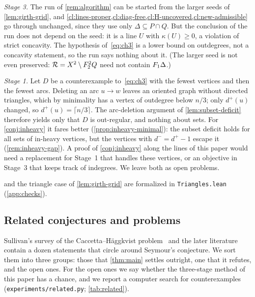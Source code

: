 \begin{remark}\label{rem:ch-obstacle}
\emph{Stage 3.} The run of \cref{rem:algorithm} can be started from the larger seeds of
\cref{lem:girth-grid}, and
\cref{cl:lines-proper,cl:diag-free,cl:H-uncovered,cl:new-admissible} go through
unchanged, since they use only $\Delta\subseteq P\cap Q$. But the conclusion of the run
does not depend on the seed: it is a line $U$ with $\kappa(U)\ge0$, a violation of
strict concavity. The hypothesis of~\eqref{eq:ch3} is a lower bound on outdegrees, not a
concavity statement, so the run says nothing about it. (The larger seed is not even
preserved: $\mathcal R=X^2\setminus F_2^2Q$ need not contain $F_1\Delta$.)

\emph{Stage 1.} Let $D$ be a counterexample to~\eqref{eq:ch3} with the fewest vertices
and then the fewest arcs. Deleting an arc $u\to w$ leaves an oriented graph without
directed triangles, which by minimality has a vertex of outdegree below $n/3$; only
$d^+(u)$ changed, so $d^+(u)=\lceil n/3\rceil$. The arc-deletion argument of
\cref{lem:subset-deficit} therefore yields only that $D$ is out-regular, and nothing
about sets. For \cref{conj:inheavy} it fares better (\cref{prop:inheavy-minimal}): the
subset deficit holds for all sets of in-heavy vertices, but the vertices with
$d^-=d^+-1$ escape it (\cref{rem:inheavy-gap}). A proof of \cref{conj:inheavy} along
the lines of this paper would need a replacement for Stage~1 that handles these
vertices, or an objective in Stage~3 that keeps track of indegrees. We leave both as
open problems.
\end{remark}

 and the triangle case of \cref{lem:girth-grid} are formalized in
\texttt{Triangles.lean} (\cref{app:checks}).

\subsection{Related conjectures and problems}\label{sec:related}

\begin{idea}
Sullivan's survey of the Caccetta--H\"aggkvist problem~\cite{Sullivan2006} and the later
literature contain a dozen statements that circle around Seymour's conjecture. We sort
them into three groups: those that \cref{thm:main} settles outright, one that it
refutes, and the open ones. For the open ones we say whether the three-stage method of
this paper has a chance, and we report a computer search for counterexamples
(\texttt{experiments/related.py}; \cref{tab:related}).
\end{idea}

